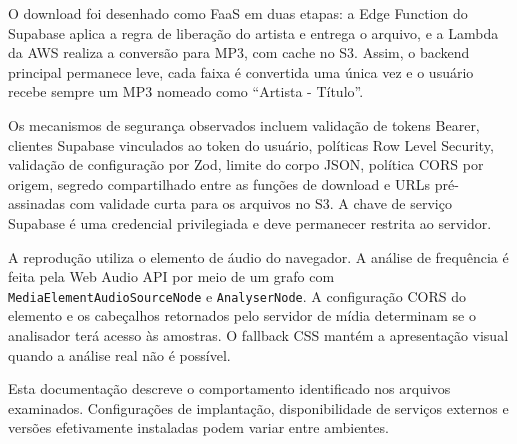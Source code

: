 \documentclass[12pt,a4paper,oneside]{report}
\begin{document}
O download foi desenhado como FaaS em duas etapas: a Edge Function do Supabase aplica a regra de liberação do artista e entrega o arquivo, e a Lambda da AWS realiza a conversão para MP3, com cache no S3. Assim, o backend principal permanece leve, cada faixa é convertida uma única vez e o usuário recebe sempre um MP3 nomeado como ``Artista - Título''.

Os mecanismos de segurança observados incluem validação de tokens Bearer, clientes Supabase vinculados ao token do usuário, políticas Row Level Security, validação de configuração por Zod, limite do corpo JSON, política CORS por origem, segredo compartilhado entre as funções de download e URLs pré-assinadas com validade curta para os arquivos no S3. A chave de serviço Supabase é uma credencial privilegiada e deve permanecer restrita ao servidor.

A reprodução utiliza o elemento de áudio do navegador. A análise de frequência é feita pela Web Audio API por meio de um grafo com \texttt{MediaElementAudioSourceNode} e \texttt{AnalyserNode}. A configuração CORS do elemento e os cabeçalhos retornados pelo servidor de mídia determinam se o analisador terá acesso às amostras. O fallback CSS mantém a apresentação visual quando a análise real não é possível.

Esta documentação descreve o comportamento identificado nos arquivos examinados. Configurações de implantação, disponibilidade de serviços externos e versões efetivamente instaladas podem variar entre ambientes.

\appendix
\end{document}
